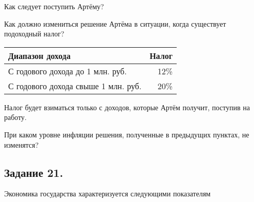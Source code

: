 \begin{list}{)}{\leftmargin=6mm  \topsep=0mm  \itemsep=3pt \parsep=1.56mm \itemindent=-1pt}
\item Как следует поступить Артёму?
\item Как должно измениться решение Артёма в ситуации, когда существует подоходный налог?

\begin{tabular}{lr}
\toprule
Диапазон дохода & Налог \\
\midrule
С годового дохода до 1 млн. руб. & 12\% \\
С годового дохода свыше 1 млн. руб. & 20\% \\
\bottomrule
\end{tabular}

Налог будет взиматься только с доходов, которые Артём получит, поступив на работу.

\item При каком уровне инфляции решения, полученные в предыдущих пунктах, не изменятся?
\end{list}


\subsection*{Задание 21.}
Экономика государства характеризуется следующими показателям

